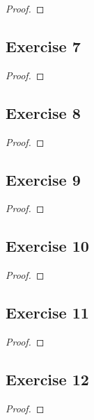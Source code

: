 \documentclass[14pt]{extarticle}
\begin{document}
\begin{proof}

\end{proof}

\subsection{Exercise 7}

\begin{proof}

\end{proof}

\subsection{Exercise 8}

\begin{proof}

\end{proof}

\subsection{Exercise 9}

\begin{proof}

\end{proof}

\subsection{Exercise 10}

\begin{proof}

\end{proof}

\subsection{Exercise 11}

\begin{proof}

\end{proof}

\subsection{Exercise 12}

\begin{proof}

\end{proof}
\end{document}
